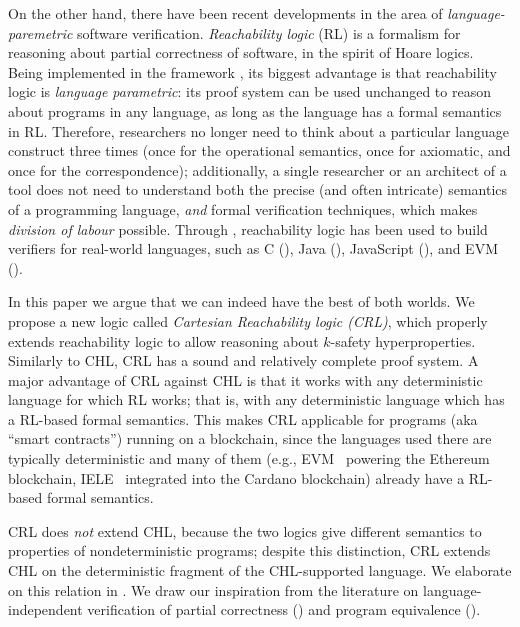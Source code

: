 On the other hand, there have been recent developments in the area of
\emph{language-paremetric} software verification.  \emph{Reachability logic}
(RL) \cite{RosuS12oopsla,RosuSCM13lics,StefanescuCMMSR19} is a formalism for
reasoning about partial correctness of software, in the spirit of Hoare
logics.  Being implemented in the \K{} framework \cite{KVision}, its biggest
advantage is that reachability logic is \emph{language parametric}: its proof
system can be used unchanged to reason about programs in any language, as long
as the language has a formal semantics in RL.  Therefore, researchers no
longer need to think about a particular language construct three times (once
for the operational semantics, once for axiomatic, and once for the
correspondence); additionally, a single researcher or an architect of a tool does not
need to understand both the precise (and often intricate) semantics of a
programming language, \emph{and} formal verification techniques, which makes
\emph{division of labour} possible.  Through \K{}, reachability logic has been
used to build verifiers for real-world languages, such as C (\cite{RVMatch}),
Java (\cite{StefanescuPYLR16VerifiersForAll}), JavaScript
(\cite{StefanescuPYLR16VerifiersForAll}), and EVM
(\cite{KevmVerificationTool}).

In this paper we argue that we can indeed have the best of both worlds.  We
propose a new logic called \emph{Cartesian Reachability logic (CRL)}, which
properly extends reachability logic to allow reasoning about $k$-safety
hyperproperties. Similarly to CHL, CRL has a sound and relatively complete
proof system. A major advantage of CRL against CHL is that it works with any
deterministic
language for which RL works; that is, with any deterministic language which has a RL-based
formal semantics.
This makes CRL applicable for programs (aka ``smart contracts'') running on a blockchain,
since the languages used there are typically deterministic
and many of them (e.g., EVM~\cite{HildenbrandtSRZ18} powering the Ethereum blockchain, IELE~\cite{KasampalisGMSZF19} integrated into the Cardano blockchain)
already have a RL-based formal semantics.

CRL does \emph{not} extend CHL, because the two
logics give different semantics to properties of nondeterministic programs;
despite this distinction, CRL extends CHL on the deterministic fragment of the
CHL-supported language.  We elaborate on this relation in
.  We draw our inspiration from the literature on
language-independent verification of partial correctness
(\cite{RosuS12oopsla,RosuSCM13lics,StefanescuCMMSR19}) and program equivalence
(\cite{CiobacaLRR16,CiobacaLRR14}).  


